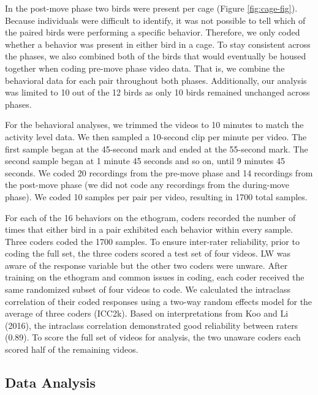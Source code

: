 \documentclass[
  pub]{apa6}
\begin{document}
In the post-move phase two birds were present per cage (Figure \ref{fig:cage-fig}). Because individuals were difficult to identify, it was not possible to tell which of the paired birds were performing a specific behavior. Therefore, we only coded whether a behavior was present in either bird in a cage. To stay consistent across the phases, we also combined both of the birds that would eventually be housed together when coding pre-move phase video data. That is, we combine the behavioral data for each pair throughout both phases. Additionally, our analysis was limited to 10 out of the 12 birds as only 10 birds remained unchanged across phases.

For the behavioral analyses, we trimmed the videos to 10 minutes to match the activity level data. We then sampled a 10-second clip per minute per video. The first sample began at the 45-second mark and ended at the 55-second mark. The second sample began at 1 minute 45 seconds and so on, until 9 minutes 45 seconds. We coded 20 recordings from the pre-move phase and 14 recordings from the post-move phase (we did not code any recordings from the during-move phase). We coded 10 samples per pair per video, resulting in 1700 total samples.

For each of the 16 behaviors on the ethogram, coders recorded the number of times that either bird in a pair exhibited each behavior within every sample. Three coders coded the 1700 samples. To ensure inter-rater reliability, prior to coding the full set, the three coders scored a test set of four videos. LW was aware of the response variable but the other two coders were unware. After training on the ethogram and common issues in coding, each coder received the same randomized subset of four videos to code. We calculated the intraclass correlation of their coded responses using a two-way random effects model for the average of three coders (ICC2k). Based on interpretations from Koo and Li (2016), the intraclass correlation demonstrated good reliability between raters (0.89). To score the full set of videos for analysis, the two unaware coders each scored half of the remaining videos.

\hypertarget{data-analysis}{%
\subsection{Data Analysis}\label{data-analysis}}
\end{document}
